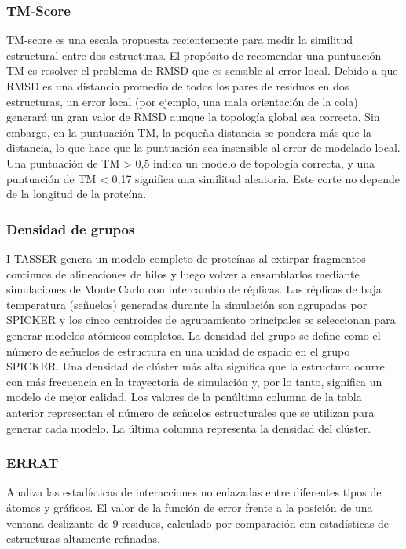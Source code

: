 \documentclass[11pt, letterpaper, spanish]{article}
\begin{document}
{{{\subsubsection{TM-Score}
\par{TM-score es una escala propuesta recientemente para medir la similitud estructural entre dos estructuras. El propósito de recomendar una puntuación TM es resolver el problema de RMSD que es sensible al error local. Debido a que RMSD es una distancia promedio de todos los pares de residuos en dos estructuras, un error local (por ejemplo, una mala orientación de la cola) generará un gran valor de RMSD aunque la topología global sea correcta. Sin embargo, en la puntuación TM, la pequeña distancia se pondera más que la distancia, lo que hace que la puntuación sea insensible al error de modelado local. Una puntuación de TM > 0,5 indica un modelo de topología correcta, y una puntuación de TM < 0,17 significa una similitud aleatoria. Este corte no depende de la longitud de la proteína.}

\subsubsection{Densidad de grupos}
\par{I-TASSER genera un modelo completo de proteínas al extirpar fragmentos continuos de alineaciones de hilos y luego volver a ensamblarlos mediante simulaciones de Monte Carlo con intercambio de réplicas. Las réplicas de baja temperatura (señuelos) generadas durante la simulación son agrupadas por SPICKER y los cinco centroides de agrupamiento principales se seleccionan para generar modelos atómicos completos. La densidad del grupo se define como el número de señuelos de estructura en una unidad de espacio en el grupo SPICKER. Una densidad de clúster más alta significa que la estructura ocurre con más frecuencia en la trayectoria de simulación y, por lo tanto, significa un modelo de mejor calidad. Los valores de la penúltima columna de la tabla anterior representan el número de señuelos estructurales que se utilizan para generar cada modelo. La última columna representa la densidad del clúster.}
\subsubsection{ERRAT}
\par{Analiza las estadísticas de interacciones no enlazadas entre diferentes tipos de átomos y gráficos. El valor de la función de error frente a la posición de una ventana deslizante de 9 residuos, calculado por comparación con estadísticas de estructuras altamente refinadas.}

}}}
\end{document}
